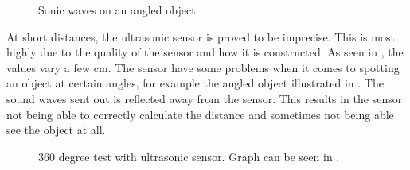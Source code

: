 \begin{figure}[H]
     \caption{\label{fig:angled_object} Sonic waves on an angled object.}
\end{figure}

At short distances, the ultrasonic sensor is proved to be imprecise. This is most highly due to the quality of the sensor and how it is constructed. As seen in , the values vary a few cm. The sensor have some problems when it comes to spotting an object at certain angles, for example the angled object illustrated in . The sound waves sent out is reflected away from the sensor. This results in the sensor not being able to correctly calculate the distance and sometimes not being able see the object at all.

\begin{figure}[H]
     \caption{\label{fig:sonar-test-drawing} 360 degree test with ultrasonic sensor. Graph can be seen in .}
\end{figure}

